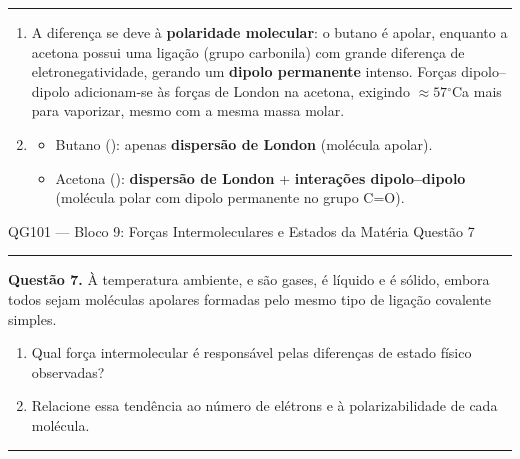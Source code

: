 \documentclass[10pt,a4paper]{article}
\newcommand{\oC}{$^\circ$C}
\newcommand{\questaoheader}[1]{%
  \begin{center}
  {\small\sffamily QG101 --- Bloco 9: Forças Intermoleculares e Estados da Matéria
  \hfill Questão #1}
  \end{center}
  \vspace{-0.3cm}
  \noindent\rule{\textwidth}{0.6pt}
  \vspace{0.1cm}
}
\newcommand{\resolucaosep}{%
  \vspace{0.4cm}
  \noindent\rule{\textwidth}{0.4pt}
  \vspace{0.1cm}

  \noindent{\bf Resolução:}
  \vspace{0.2cm}
}
\begin{document}
\resolucaosep

\begin{enumerate}
  \item A diferença se deve à \textbf{polaridade molecular}: o butano é
        apolar, enquanto a acetona possui uma ligação  (grupo
        carbonila) com grande diferença de eletronegatividade, gerando um
        \textbf{dipolo permanente} intenso. Forças dipolo--dipolo
        adicionam-se às forças de London na acetona, exigindo
        $\approx 57$\oC a mais para vaporizar, mesmo com a mesma massa
        molar.

  \item
    \begin{itemize}
      \item Butano (): apenas \textbf{dispersão de London}
            (molécula apolar).
      \item Acetona (): \textbf{dispersão de London} +
            \textbf{interações dipolo--dipolo} (molécula polar com dipolo
            permanente no grupo C=O).
    \end{itemize}
\end{enumerate}

\clearpage

\questaoheader{7}

\noindent\textbf{Questão 7.}
À temperatura ambiente,  e  são gases,  é líquido e
 é sólido, embora todos sejam moléculas apolares formadas pelo
mesmo tipo de ligação covalente simples.
\begin{enumerate}
  \item Qual força intermolecular é responsável pelas diferenças de
        estado físico observadas?
  \item Relacione essa tendência ao número de elétrons e à
        polarizabilidade de cada molécula.
\end{enumerate}

\resolucaosep
\end{document}
